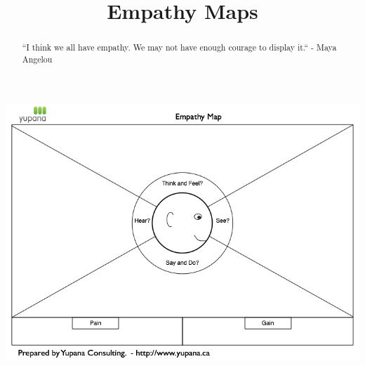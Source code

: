 \documentclass{ximera}
\title{Empathy Maps}
\begin{document}
\begin{abstract}
``I think we all have empathy. We may not have enough courage to display it.`` - Maya Angelou
\end{abstract}
\maketitle

\begin{image}
\includegraphics{Empathy-Map.png}
\end{image}
\end{document}
